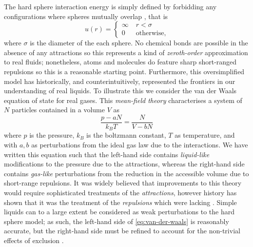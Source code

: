 \documentclass[11pt,twoside]{report}
\begin{document}
The hard sphere interaction energy is simply defined by forbidding any configurations where spheres mutually overlap%
,
that is
\begin{equation}\label{eq:hs-interaction}
  u(r) =
  \begin{cases}
    \infty & \; r < \sigma \\
    0 & \; \textrm{otherwise},
  \end{cases}
\end{equation}
where $\sigma$ is the diameter of the each sphere.
No chemical bonds are possible in the absence of any attractions so this represents a kind of \emph{zeroth-order} approximation to real fluids; nonetheless, atoms and molecules do feature sharp short-ranged repulsions so this is a reasonable starting point.
Furthermore, this oversimplified model has historically, and counterintuitively, represented the frontiers in our understanding of real liquids.
To illustrate this we consider the van der Waals equation of state for real gases.
This \emph{mean-field theory} characterises a system of $N$ particles contained in a volume $V$ as
\begin{equation}\label{eq:van-der-waals}
  \frac{p - a N}{k_B T} = \frac{N}{V - b N}
\end{equation}
where $p$ is the pressure, $k_B$ is the boltzmann constant, $T$ as temperature, and with $a,b$ as perturbations from the ideal gas law due to the interactions.
We have written this equation such that the left-hand side contains \emph{liquid-like} modifications to the pressure due to the attractions, whereas the right-hand side contains \emph{gas-like} perturbations from the reduction in the accessible volume due to short-range repulsions.
It was widely believed that improvements to this theory would require sophisticated treatments of the \emph{attractions}, however history has shown that it was the treatment of the \emph{repulsions} which were lacking \cite{Santos2016}.
Simple liquids can to a large extent be considered as weak perturbations to the hard sphere model; as such, the left-hand side of \eqref{eq:van-der-waals} is reasonably accurate, but the right-hand side must be refined to account for the non-trivial effects of exclusion \cite{Hansen2013}.

\end{document}

